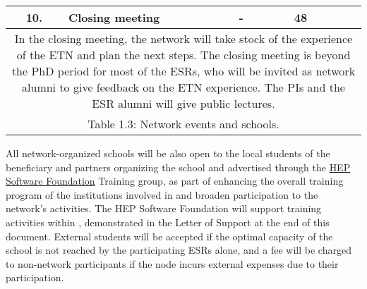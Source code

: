 \begin{center}
\begin{tabular}{@{}|c|p{45mm}|p{7mm}|p{30mm}|p{15mm}|p{45mm}|@{}}
				\cellcolor{red!70!black} 10. & \textbf{Closing meeting} & - & \heidelbergentity & 48  \tabularnewline\midrule
				\multicolumn{6}{|p{0.975\textwidth}|}{					
In the closing meeting, the network will take stock of the experience of the ETN and plan the next steps. 
The closing meeting is beyond the PhD period for most of the ESRs, who will be invited as network alumni to give feedback on the ETN experience. The PIs and the ESR alumni will give public lectures. 
				} \tabularnewline \hline %
				\multicolumn{6}{p{0.975\textwidth}}{
				Table 1.3: Network events and schools.  
				}		
			\end{tabular}
\end{center}
All network-organized schools will be also open to the local students of the beneficiary and partners organizing the school and advertised through the \href{http://hepsoftwarefoundation.org}{HEP Software Foundation} Training group, as part of enhancing the overall training program of the institutions involved in \acronym and broaden participation to the network's activities. 
The HEP Software Foundation will support training activities within \acronym, demonstrated in the Letter of Support at the end of this document. 
External students will be accepted if the optimal capacity of the school is not reached by the participating ESRs alone, and a fee will be charged to non-network participants if the node incurs external expenses due to their participation. 


